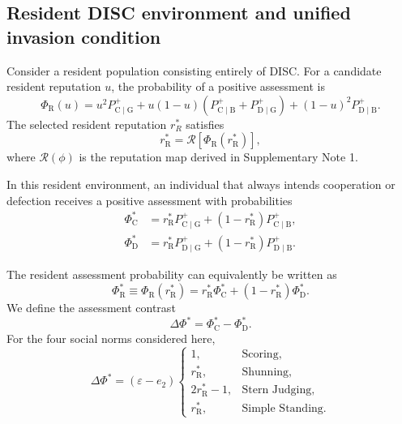 \documentclass[fleqn,10pt]{wlscirep}
\begin{document}
\subsection{Resident DISC environment and unified invasion condition}

Consider a resident population consisting entirely of DISC.
For a candidate resident reputation $u$, the probability of a positive assessment is
\begin{equation}
\Phi_{\mathrm R}(u)=u^2P^+_{\mathrm C\mid\mathrm G}+u(1-u)\left(P^+_{\mathrm C\mid\mathrm B}+P^+_{\mathrm D\mid\mathrm G}\right)+(1-u)^2P^+_{\mathrm D\mid\mathrm B}.
\label{eq:si-resident-assessment-strategy}
\end{equation}
The selected resident reputation $r_R^*$ satisfies
\begin{equation}
r_{\mathrm R}^{*}=\mathcal R\!\left[\Phi_{\mathrm R}(r_{\mathrm R}^{*})\right],
\label{eq:si-resident-reputation-strategy}
\end{equation}
where $\mathcal R(\phi)$ is the reputation map derived in Supplementary Note 1.



In this resident environment, an individual that always intends cooperation or defection receives a positive assessment with probabilities
\begin{align}
\Phi_{\mathrm C}^{*}
&=r_{\mathrm R}^{*}P^+_{\mathrm C\mid\mathrm G}+(1-r_{\mathrm R}^{*})P^+_{\mathrm C\mid\mathrm B},
\label{eq:si-allc-assessment-strategy}
\\
\Phi_{\mathrm D}^{*}
&=r_{\mathrm R}^{*}P^+_{\mathrm D\mid\mathrm G}+(1-r_{\mathrm R}^{*})P^+_{\mathrm D\mid\mathrm B}.
\label{eq:si-alld-assessment-strategy}
\end{align}

The resident assessment probability can equivalently be written as
\begin{equation}
\Phi_\mathrm R^*
\equiv
\Phi_\mathrm R(r_\mathrm R^*)=r_\mathrm R^*\Phi_\mathrm C^*+(1-r_\mathrm R^*)\Phi_\mathrm D^*.
\end{equation}
We define the assessment contrast
\begin{equation}
\Delta\Phi^*=\Phi_\mathrm C^*-\Phi_\mathrm D^*.
\label{eq:SI_assessment_contrast}
\end{equation}
For the four social norms considered here,
\begin{equation}
\Delta\Phi^*
=(\varepsilon-e_2)
\begin{cases}
1, & \text{Scoring},\\
r_\mathrm R^*, & \text{Shunning},\\
2r_\mathrm R^*-1, & \text{Stern Judging},\\
r_\mathrm R^*, & \text{Simple Standing}.
\end{cases}
\label{eq:SI_assessment_contrast_norms}
\end{equation}
\end{document}
